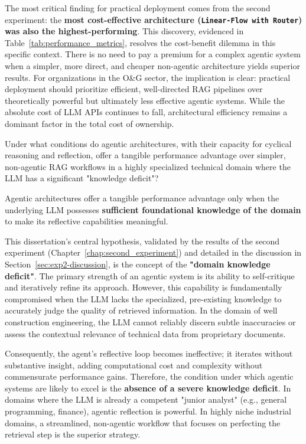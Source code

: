     The most critical finding for practical deployment comes from the second experiment: the \textbf{most cost-effective architecture (\texttt{Linear-Flow with Router}) was also the highest-performing}. This discovery, evidenced in Table~\ref{tab:performance_metrics}, resolves the cost-benefit dilemma in this specific context. There is no need to pay a premium for a complex agentic system when a simpler, more direct, and cheaper non-agentic architecture yields superior results. For organizations in the O\&G sector, the implication is clear: practical deployment should prioritize efficient, well-directed RAG pipelines over theoretically powerful but ultimately less effective agentic systems. While the absolute cost of LLM APIs continues to fall, architectural efficiency remains a dominant factor in the total cost of ownership.

    \vspace{\baselineskip}
    \begin{tcolorbox}[colback=gray!10, colframe=gray!40, title=\textbf{RQ3: Agentic Systems and Domain Specificity}]
    Under what conditions do agentic architectures, with their capacity for cyclical reasoning and reflection, offer a tangible performance advantage over simpler, non-agentic RAG workflows in a highly specialized technical domain where the LLM has a significant "knowledge deficit"?
    \end{tcolorbox}
    \vspace{\baselineskip}

    Agentic architectures offer a tangible performance advantage only when the underlying LLM possesses \textbf{sufficient foundational knowledge of the domain} to make its reflective capabilities meaningful.

    This dissertation's central hypothesis, validated by the results of the second experiment (Chapter~\ref{chap:second_experiment}) and detailed in the discussion in Section~\ref{sec:exp2-discussion}, is the concept of the \textbf{"domain knowledge deficit"}. The primary strength of an agentic system is its ability to self-critique and iteratively refine its approach. However, this capability is fundamentally compromised when the LLM lacks the specialized, pre-existing knowledge to accurately judge the quality of retrieved information. In the domain of well construction engineering, the LLM cannot reliably discern subtle inaccuracies or assess the contextual relevance of technical data from proprietary documents.

    Consequently, the agent's reflective loop becomes ineffective; it iterates without substantive insight, adding computational cost and complexity without commensurate performance gains. Therefore, the condition under which agentic systems are likely to excel is the \textbf{absence of a severe knowledge deficit}. In domains where the LLM is already a competent "junior analyst" (e.g., general programming, finance), agentic reflection is powerful. In highly niche industrial domains, a streamlined, non-agentic workflow that focuses on perfecting the retrieval step is the superior strategy.

